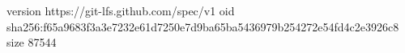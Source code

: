 version https://git-lfs.github.com/spec/v1
oid sha256:f65a9683f3a3e7232e61d7250e7d9ba65ba5436979b254272e54fd4c2e3926c8
size 87544
